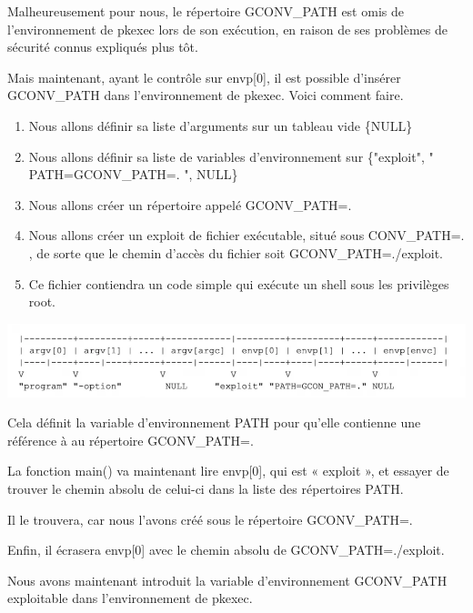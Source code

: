 \documentclass[12pt,a4paper]{article}
\begin{document}
\begin{flushleft}
            \item Malheureusement pour nous, le répertoire GCONV\_PATH est omis de l’environnement de pkexec lors de son exécution, en raison de ses problèmes de sécurité connus expliqués plus tôt.
            \item Mais maintenant, ayant le contrôle sur envp[0], il est possible d'insérer GCONV\_PATH dans l'environnement de pkexec. Voici comment faire.
            \begin{enumerate}
                \item Nous allons définir sa liste d’arguments sur un tableau vide \{NULL\}
                \item Nous allons définir sa liste de variables d’environnement sur \{"exploit", " PATH=GCONV\_PATH=. ", NULL\}
                \item Nous allons créer un répertoire appelé GCONV\_PATH=.
                \item Nous allons créer un exploit de fichier exécutable, situé sous CONV\_PATH=. , de sorte que le chemin d’accès du fichier soit GCONV\_PATH=./exploit.
                \item Ce fichier contiendra un code simple qui exécute un shell sous les privilèges root.
            \end{enumerate}
            \begin{center}
                \includegraphics[scale=0.4]{exec} \cite{CVE2021425:online}
            \end{center}
            \item Cela définit la variable d’environnement PATH pour qu’elle contienne une référence à au répertoire GCONV\_PATH=. 
            \item La fonction main() va maintenant lire envp[0], qui est « exploit », et essayer de trouver le chemin absolu de celui-ci dans la liste des répertoires PATH. 
            \item Il le trouvera, car nous l’avons créé sous le répertoire GCONV\_PATH=. 
            \item Enfin, il écrasera envp[0] avec le chemin absolu de GCONV\_PATH=./exploit.
            \item Nous avons maintenant introduit la variable d’environnement GCONV\_PATH exploitable dans l’environnement de pkexec. 

\end{flushleft}
\end{document}
